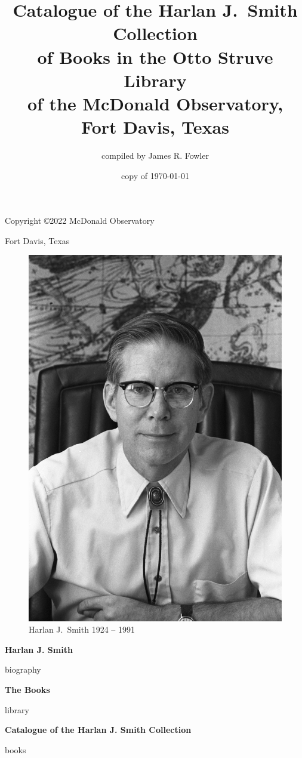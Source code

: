 \documentclass[letterpaper]{book}
\begin{document}
\frontmatter
\pagestyle{empty}
\title{Catalogue of the Harlan J.~Smith Collection \\
  of Books in the Otto Struve Library \\
  of the McDonald Observatory, \\
  Fort Davis, Texas}
\author{compiled by James R. Fowler}
\date{copy of \today}
\maketitle
\newpage

\vspace*{5 in}
\centerline{Copyright \copyright 2022 McDonald Observatory}
\centerline{Fort Davis, Texas}
\newpage

\pagestyle{plain}
\begin{figure}[t]
  \centering
  \includegraphics{hjs_photo.jpg}
  Harlan J.~Smith 1924 -- 1991
  \label{fig:hjs}
\end{figure}
\clearpage
\mbox{}
\thispagestyle{empty}
\newpage


\centerline{\Large \bf Harlan J. Smith}
\bigskip
{biography}
\newpage

\centerline{\Large \bf The Books}
\bigskip
{library}
\newpage

\printbibliography

\mainmatter
\begin{center}
  {\Large \bf Catalogue of the Harlan J. Smith Collection}
\end{center}
\bigskip
{books}
\end{document}
